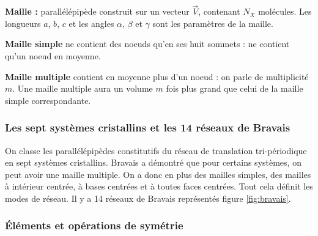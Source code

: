 \documentclass{article}
\begin{document}
\noindent\textbf{Maille :} parallélépipède construit sur un vecteur $\vec V$, contenant $N_X$ molécules.
Les longueurs $a$, $b$, $c$ et les angles $\alpha$, $\beta$ et $\gamma$ sont les paramètres de la maille.

\noindent\textbf{Maille simple} ne contient des noeuds qu'en ses huit sommets : ne contient qu'un noeud en moyenne.

\noindent\textbf{Maille multiple} contient en moyenne plus d'un noeud : on parle de multiplicité $m$.
Une maille multiple aura un volume $m$ fois plus grand que celui de la maille simple correspondante.


\subsubsection{Les sept systèmes cristallins et les 14 réseaux de Bravais}\label{subsec:les-sept-systemes-cristallins-et-les-14-reseaux-de-bravais}

On classe les parallélépipèdes constitutifs du réseau de translation tri-périodique en sept systèmes cristallins.
Bravais a démontré que pour certains systèmes, on peut avoir une maille multiple.
On a donc en plus des mailles simples, des mailles à intérieur centrée, à bases centrées et à toutes faces centrées.
Tout cela définit les modes de réseau.
Il y a 14 réseaux de Bravais représentés figure \ref{fig:bravais}.

\vspace{0.4cm}
\subsubsection{Éléments et opérations de symétrie}\label{subsec:elements-et-operations-de-symetrie}
\end{document}
